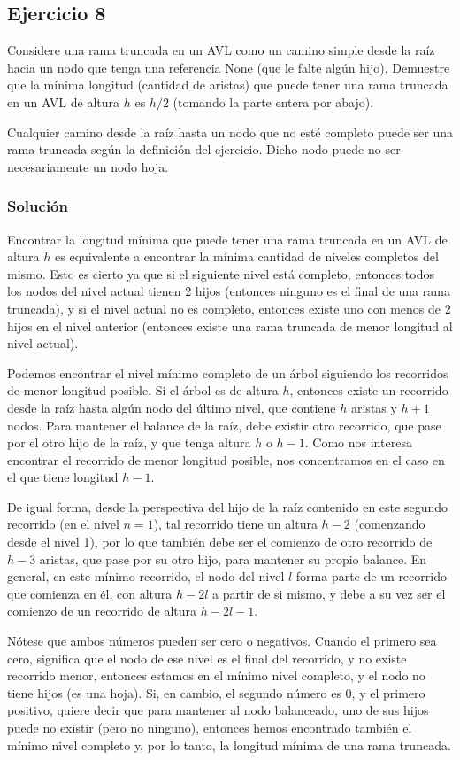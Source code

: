 \documentclass{article}
\begin{document}
\subsection*{Ejercicio 8}
Considere una rama truncada en un AVL como un camino simple desde la raíz hacia un nodo que tenga una referencia None (que le falte algún hijo). Demuestre que la mínima longitud (cantidad de aristas) que puede tener una rama truncada en un AVL de altura $h$ es $h/2$ (tomando la parte entera por abajo).

Cualquier camino desde la raíz hasta un nodo que no esté completo puede ser una rama truncada según la definición del ejercicio. Dicho nodo puede no ser necesariamente un nodo hoja.
\subsubsection*{Solución}
Encontrar la longitud mínima que puede tener una rama truncada en un AVL de altura $h$ es equivalente a encontrar la mínima cantidad de niveles completos del mismo. Esto es cierto ya que si el siguiente nivel está completo, entonces todos los nodos del nivel actual tienen 2 hijos (entonces ninguno es el final de una rama truncada), y si el nivel actual no es completo, entonces existe uno con menos de 2 hijos en el nivel anterior (entonces existe una rama truncada de menor longitud al nivel actual).

Podemos encontrar el nivel mínimo completo de un árbol siguiendo los recorridos de menor longitud posible. Si el árbol es de altura $h$, entonces existe un recorrido desde la raíz hasta algún nodo del último nivel, que contiene $h$ aristas y $h+1$ nodos. Para mantener el balance de la raíz, debe existir otro recorrido, que pase por el otro hijo de la raíz, y que tenga altura $h$ o $h-1$. Como nos interesa encontrar el recorrido de menor longitud posible, nos concentramos en el caso en el que tiene longitud $h-1$.

De igual forma, desde la perspectiva del hijo de la raíz contenido en este segundo recorrido (en el nivel $n=1$), tal recorrido tiene un altura $h-2$ (comenzando desde el nivel 1), por lo que también debe ser el comienzo de otro recorrido de $h-3$ aristas, que pase por su otro hijo, para mantener su propio balance. En general, en este mínimo recorrido, el nodo del nivel $l$ forma parte de un recorrido que comienza en él, con altura $h-2l$ a partir de si mismo, y debe a su vez ser el comienzo de un recorrido de altura $h-2l-1$.

Nótese que ambos números pueden ser cero o negativos. Cuando el primero sea cero, significa que el nodo de ese nivel es el final del recorrido, y no existe recorrido menor, entonces estamos en el mínimo nivel completo, y el nodo no tiene hijos (es una hoja). Si, en cambio, el segundo número es 0, y el primero positivo, quiere decir que para mantener al nodo balanceado, uno de sus hijos puede no existir (pero no ninguno), entonces hemos encontrado también el mínimo nivel completo y, por lo tanto, la longitud mínima de una rama truncada.
\end{document}
